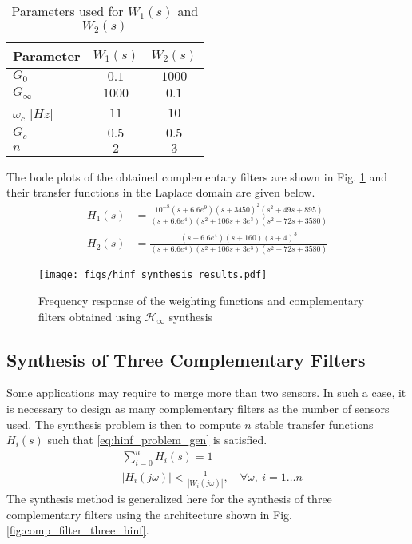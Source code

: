 \documentclass[conference]{IEEEtran}
\begin{document}
\begin{table}[htbp]
\caption{\label{tab:weights_params}
Parameters used for \(W_1(s)\) and \(W_2(s)\)}
\centering
\begin{tabularx}{0.5\linewidth}{Xcc}
\toprule
Parameter & \(W_1(s)\) & \(W_2(s)\)\\
\midrule
\(G_0\) & \(0.1\) & \(1000\)\\
\(G_\infty\) & \(1000\) & \(0.1\)\\
\(\omega_c\) [\(\si{Hz}\)] & \(11\) & \(10\)\\
\(G_c\) & \(0.5\) & \(0.5\)\\
\(n\) & \(2\) & \(3\)\\
\bottomrule
\end{tabularx}
\end{table}

The bode plots of the obtained complementary filters are shown in Fig. \ref{fig:hinf_synthesis_results} and their transfer functions in the Laplace domain are given below.
\begin{align*}
  H_1(s) &= \frac{10^{-8} (s+6.6e^9) (s+3450)^2 (s^2 + 49s + 895)}{(s+6.6e^4) (s^2 + 106 s + 3e^3) (s^2 + 72s + 3580)}\\
  H_2(s) &= \frac{(s+6.6e^4) (s+160) (s+4)^3}{(s+6.6e^4) (s^2 + 106 s + 3e^3) (s^2 + 72s + 3580)}
\end{align*}

\begin{figure}[htbp]
\centering
\texttt{[image: figs/hinf\_synthesis\_results.pdf]}
\caption{\label{fig:hinf_synthesis_results}
Frequency response of the weighting functions and complementary filters obtained using \(\mathcal{H}_\infty\) synthesis}
\end{figure}

\subsection{Synthesis of Three Complementary Filters}
\label{sec:org9751f7b}
\label{sec:hinf_three_comp_filters}
Some applications may require to merge more than two sensors.
In such a case, it is necessary to design as many complementary filters as the number of sensors used.
The synthesis problem is then to compute \(n\) stable transfer functions \(H_i(s)\) such that \eqref{eq:hinf_problem_gen} is satisfied.
\begin{subequations}
\label{eq:hinf_problem_gen}
  \begin{align}
  & \sum_{i=0}^n H_i(s) = 1 \label{eq:hinf_cond_compl_gen} \\
  & \left| H_i(j\omega) \right| < \frac{1}{\left| W_i(j\omega) \right|}, \quad \forall \omega,\ i = 1 \dots n \label{eq:hinf_cond_perf_gen}
  \end{align}
\end{subequations}
The synthesis method is generalized here for the synthesis of three complementary filters using the architecture shown in Fig. \ref{fig:comp_filter_three_hinf}.
\end{document}
